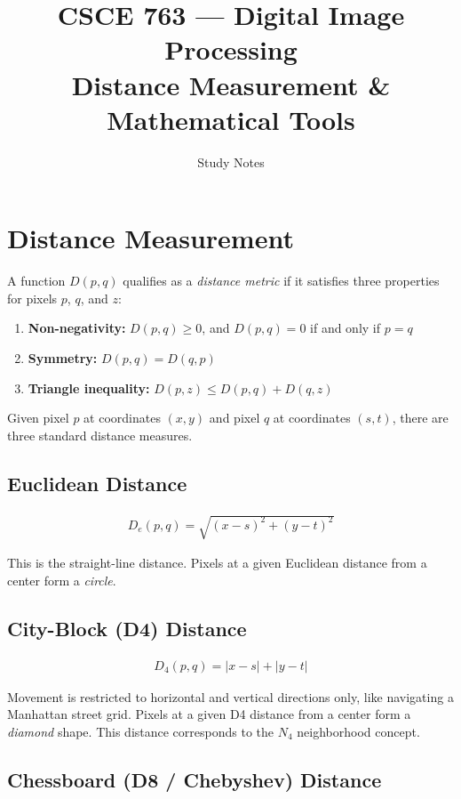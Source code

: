 \documentclass[11pt]{article}
\title{\textbf{\color{garnet}CSCE 763 --- Digital Image Processing\\[4pt] Distance Measurement \& Mathematical Tools}}
\author{Study Notes}
\date{}
\begin{document}
\maketitle
\thispagestyle{empty}

\section{Distance Measurement}

A function $D(p, q)$ qualifies as a \textit{distance metric} if it satisfies three properties for pixels $p$, $q$, and $z$:

\begin{enumerate}[label=(\alph*)]
    \item \textbf{Non-negativity:} $D(p,q) \geq 0$, and $D(p,q) = 0$ if and only if $p = q$
    \item \textbf{Symmetry:} $D(p,q) = D(q,p)$
    \item \textbf{Triangle inequality:} $D(p,z) \leq D(p,q) + D(q,z)$
\end{enumerate}

Given pixel $p$ at coordinates $(x, y)$ and pixel $q$ at coordinates $(s, t)$, there are three standard distance measures.

\subsection{Euclidean Distance}

\begin{align}
    D_e(p,q) = \sqrt{(x-s)^2 + (y-t)^2}
\end{align}

This is the straight-line distance. Pixels at a given Euclidean distance from a center form a \textit{circle}.

\subsection{City-Block (D4) Distance}

\begin{align}
    D_4(p,q) = |x - s| + |y - t|
\end{align}

Movement is restricted to horizontal and vertical directions only, like navigating a Manhattan street grid. Pixels at a given D4 distance from a center form a \textit{diamond} shape. This distance corresponds to the $N_4$ neighborhood concept.

\subsection{Chessboard (D8 / Chebyshev) Distance}
\end{document}
